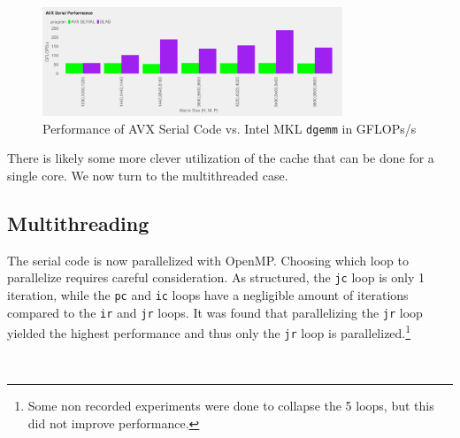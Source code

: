 \documentclass{article}
\begin{document}
\begin{figure}[H]
    \centering
    \includegraphics[width=0.8\textwidth]{../../project/out/avx-serial-gflops.pdf}
    \caption{Performance of AVX Serial Code vs. Intel MKL \texttt{dgemm} in GFLOPs/s}
    \label{FIG:AVX-SERIAL-GFLOPS}
\end{figure}
\noindent There is likely some more clever utilization of the cache that can be done for a single core. 
We now turn to the multithreaded case.

\subsection{Multithreading}
The serial code is now parallelized with OpenMP. Choosing which loop to parallelize requires careful consideration. 
As structured, the \texttt{jc} loop is only 1 iteration, while the \texttt{pc} and \texttt{ic} loops have 
a negligible amount of iterations compared to the \texttt{ir} and \texttt{jr} loops. It 
was found that parallelizing the \texttt{jr} loop yielded the highest performance and thus only the \texttt{jr} loop is parallelized.\footnote{Some non recorded experiments were done to collapse the 5 loops, but this did not improve performance.}

\
\end{document}
